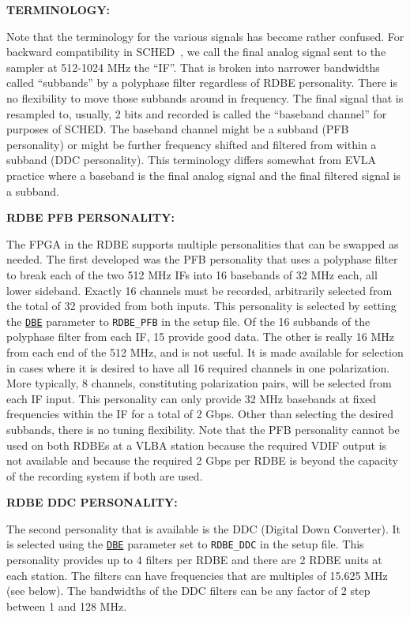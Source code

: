 \documentclass{report}
\newcommand{\sched}{{\sc SCHED}}
\newcommand{\schedb}{{\sc SCHED~}}
\begin{document}
{\bf TERMINOLOGY:}

Note that the terminology for the various signals has become rather
confused.  For backward compatibility in \schedb, we call the final
analog signal sent to the sampler at 512-1024 MHz the ``IF''.  That is
broken into narrower bandwidths called ``subbands'' by a polyphase
filter regardless of RDBE personality.  There is no flexibility to
move those subbands around in frequency.  The final signal that is
resampled to, usually, 2 bits and recorded is called the ``baseband
channel'' for purposes of \sched.  The baseband channel might be a
subband (PFB personality) or might be further frequency shifted and
filtered from within a subband (DDC personality).  This terminology
differs somewhat from EVLA practice where a baseband is the final 
analog signal and the final filtered signal is a subband.

{\bf RDBE PFB PERSONALITY:}

The FPGA in the RDBE supports multiple personalities that can be
swapped as needed.  The first developed was the PFB personality that
uses a polyphase filter to break each of the two 512 MHz IFs into 16
basebands of 32 MHz each, all lower sideband.  Exactly 16 channels
must be recorded, arbitrarily selected from the total of 32 provided
from both inputs.  This personality is selected by setting the
{\hyperref[SP:DBE]{{\tt DBE}}} parameter to {\tt RDBE\_PFB} in the setup
file.  Of the 16 subbands of the polyphase filter from each IF, 15
provide good data.  The other is really 16 MHz from each end of the
512 MHz, and is not useful.  It is made available for selection in
cases where it is desired to have all 16 required channels in one
polarization.  More typically, 8 channels, constituting polarization
pairs, will be selected from each IF input.  This personality can only
provide 32 MHz basebands at fixed frequencies within the IF for a
total of 2 Gbps.  Other than selecting the desired subbands, there is
no tuning flexibility.  Note that the PFB personality cannot be used
on both RDBEs at a VLBA station because the required VDIF output is
not available and because the required 2 Gbps per RDBE is beyond the
capacity of the recording system if both are used.


{\bf RDBE DDC PERSONALITY:}

The second personality that is available is the DDC (Digital Down
Converter).  It is selected using the 
{\hyperref[SP:DBE]{{\tt DBE}}}
parameter set to {\tt RDBE\_DDC} in the setup file. This personality
provides up to 4 filters per RDBE and there are 2 RDBE units at each
station.  The filters can have frequencies that are multiples of
15.625 MHz (see below).  The bandwidths of the DDC filters can be any
factor of 2 step between 1 and 128 MHz.
\end{document}
